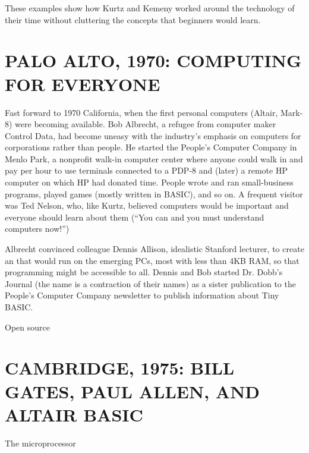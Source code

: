 \documentclass{article}
\begin{document}
These examples show how Kurtz and Kemeny worked around the technology of their
time without cluttering the concepts that beginners would learn.




\section{PALO ALTO, 1970: COMPUTING FOR EVERYONE}


Fast forward to 1970 California, when the first personal computers (Altair,
Mark-8) were becoming available.  Bob Albrecht, a refugee from computer
maker Control
Data, had become uneasy with the industry's emphasis on computers for
corporations rather than people.  He 
started the People's Computer Company in Menlo Park, a nonprofit walk-in
computer center where anyone could walk in and pay per hour to use
terminals connected to a PDP-8 and (later) a remote HP computer on which
HP had donated time.  People wrote and ran small-business programs, played games
(mostly written in BASIC), and so on.
A frequent visitor was Ted Nelson, who, like Kurtz, believed computers
would be important and everyone should learn about them (``You can and
you must understand computers now!'')

Albrecht convinced colleague Dennis Allison,
idealistic Stanford lecturer, to create an   that
would run on the emerging PCs, most with less than 4KB RAM, so that
programming might be accessible to all.  Dennis and
Bob started Dr. Dobb's Journal (the name is a contraction of their names)
as a sister publication to the 
People's Computer Company newsletter to publish information about Tiny BASIC.

\begin{milestone}{Open source}

\end{milestone}

\section{CAMBRIDGE, 1975: BILL GATES, PAUL ALLEN, AND ALTAIR BASIC}

\begin{milestone}{The microprocessor}

\end{milestone}

\end{document}
